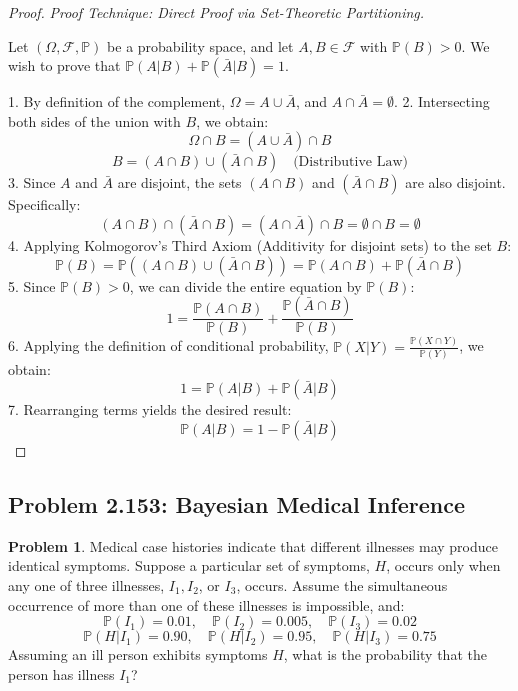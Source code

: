 \documentclass[11pt]{article}
\theoremstyle{definition}
\newtheorem{problem}{Problem}[section]
\theoremstyle{remark}
\newcommand{\F}{\mathcal{F}}
\newcommand{\Prob}{\mathbb{P}}
\begin{document}
\begin{proof}
\textit{Proof Technique: Direct Proof via Set-Theoretic Partitioning.}

Let $(\Omega, \F, \Prob)$ be a probability space, and let $A, B \in \F$ with $\Prob(B) > 0$. We wish to prove that $\Prob(A|B) + \Prob(\bar{A}|B) = 1$.

1. By definition of the complement, $\Omega = A \cup \bar{A}$, and $A \cap \bar{A} = \emptyset$.
2. Intersecting both sides of the union with $B$, we obtain:
   \[ \Omega \cap B = (A \cup \bar{A}) \cap B \]
   \[ B = (A \cap B) \cup (\bar{A} \cap B) \quad \text{(Distributive Law)} \]
3. Since $A$ and $\bar{A}$ are disjoint, the sets $(A \cap B)$ and $(\bar{A} \cap B)$ are also disjoint. Specifically:
   \[ (A \cap B) \cap (\bar{A} \cap B) = (A \cap \bar{A}) \cap B = \emptyset \cap B = \emptyset \]
4. Applying Kolmogorov's Third Axiom (Additivity for disjoint sets) to the set $B$:
   \[ \Prob(B) = \Prob\left((A \cap B) \cup (\bar{A} \cap B)\right) = \Prob(A \cap B) + \Prob(\bar{A} \cap B) \]
5. Since $\Prob(B) > 0$, we can divide the entire equation by $\Prob(B)$:
   \[ 1 = \frac{\Prob(A \cap B)}{\Prob(B)} + \frac{\Prob(\bar{A} \cap B)}{\Prob(B)} \]
6. Applying the definition of conditional probability, $\Prob(X|Y) = \frac{\Prob(X \cap Y)}{\Prob(Y)}$, we obtain:
   \[ 1 = \Prob(A|B) + \Prob(\bar{A}|B) \]
7. Rearranging terms yields the desired result:
   \[ \Prob(A|B) = 1 - \Prob(\bar{A}|B) \]
\end{proof}

\subsection{Problem 2.153: Bayesian Medical Inference}
\begin{problem}
Medical case histories indicate that different illnesses may produce identical symptoms. Suppose a particular set of symptoms, $H$, occurs only when any one of three illnesses, $I_1, I_2$, or $I_3$, occurs. Assume the simultaneous occurrence of more than one of these illnesses is impossible, and:
\[ \Prob(I_1) = 0.01, \quad \Prob(I_2) = 0.005, \quad \Prob(I_3) = 0.02 \]
\[ \Prob(H|I_1) = 0.90, \quad \Prob(H|I_2) = 0.95, \quad \Prob(H|I_3) = 0.75 \]
Assuming an ill person exhibits symptoms $H$, what is the probability that the person has illness $I_1$?
\end{problem}
\end{document}

